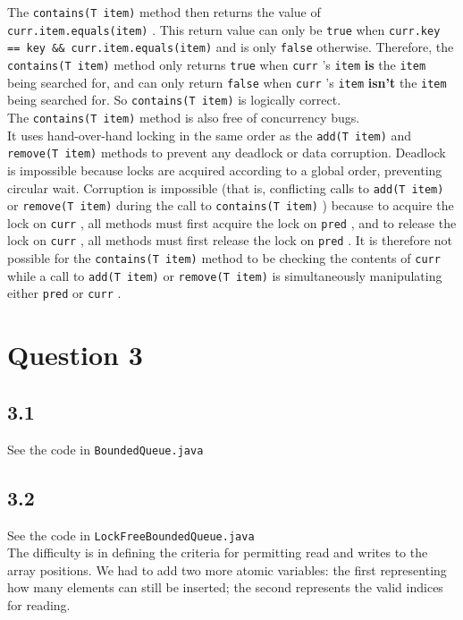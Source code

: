 \documentclass[11pt, letterpaper]{article}
\newcommand{\code}[1] { \texttt{#1} }
\begin{document}
The \code{contains(T item)} method then returns the value of \code{curr.item.equals(item)}. This return value can only be \code{true} when \code{curr.key == key && curr.item.equals(item)} and is only \code{false} otherwise. Therefore, the \code{contains(T item)} method only returns \code{true} when \code{curr}'s \code{item} \textbf{is} the \code{item} being searched for, and can only return \code{false} when \code{curr}'s \code{item} \textbf{isn't} the \code{item} being searched for. So \code{contains(T item)} is logically correct.\\

The \code{contains(T item)} method is also free of concurrency bugs.\\

It uses hand-over-hand locking in the same order as the \code{add(T item)} and \code{remove(T item)} methods to prevent any deadlock or data corruption. Deadlock is impossible because locks are acquired according to a global order, preventing circular wait. Corruption is impossible (that is, conflicting calls to \code{add(T item)} or \code{remove(T item)} during the call to \code{contains(T item)}) because to acquire the lock on \code{curr}, all methods must first acquire the lock on \code{pred}, and to release the lock on \code{curr}, all methods must first release the lock on \code{pred}. It is therefore not possible for the \code{contains(T item)} method to be checking the contents of \code{curr} while a call to \code{add(T item)} or \code{remove(T item)} is simultaneously manipulating either \code{pred} or \code{curr}.

\newpage
\section*{Question 3}
\subsection*{3.1}

See the code in \texttt{BoundedQueue.java}

\subsection*{3.2}

See the code in \texttt{LockFreeBoundedQueue.java}\\

The difficulty is in defining the criteria for permitting read and writes to the array positions. We had to add two more atomic variables: the first representing how many elements can still be inserted; the second represents the valid indices for reading.
\end{document}

